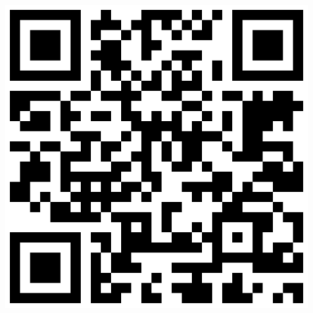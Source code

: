 \documentclass{yalcv}
\begin{document}
\begin{cvsidebar}
	\begin{cvsidebarbox}[b]
		\includegraphics[width=0.35\currentwidth]{qrcode}
	\end{cvsidebarbox}
\end{cvsidebar}%

\newpage%
\end{document}
